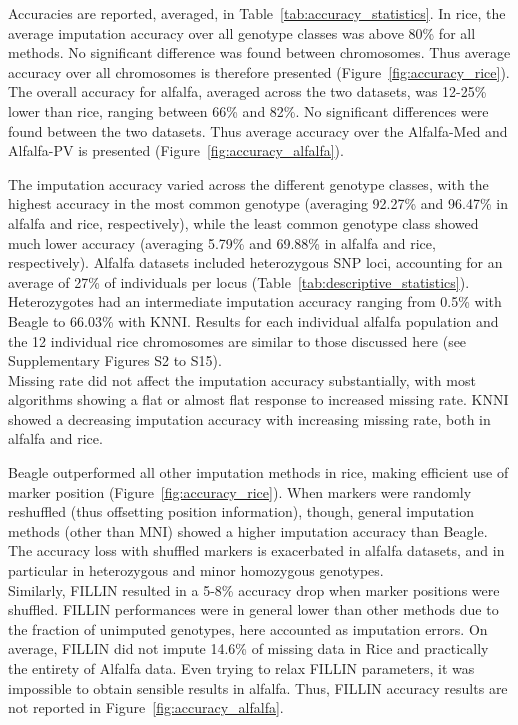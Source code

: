  

Accuracies are reported, averaged, in Table~\ref{tab:accuracy_statistics}. In rice, the average imputation accuracy over all genotype classes was above 80\% for all methods. No significant difference was found between chromosomes. Thus average accuracy over all chromosomes is therefore presented (Figure~\ref{fig:accuracy_rice}). \\
The overall accuracy for alfalfa, averaged across the two datasets, was 12-25\% lower than rice, ranging between 66\% and 82\%. No significant differences were found between the two datasets. Thus average accuracy over the Alfalfa-Med and Alfalfa-PV is presented (Figure~\ref{fig:accuracy_alfalfa}).

The imputation accuracy varied across the different genotype classes, with the highest accuracy in the most common genotype (averaging 92.27\% and 96.47\% in alfalfa and rice, respectively), while the least common genotype class showed much lower accuracy (averaging 5.79\% and 69.88\% in alfalfa and rice, respectively).
Alfalfa datasets included heterozygous SNP loci, accounting for an average of 27\% of individuals per locus (Table~\ref{tab:descriptive_statistics}). Heterozygotes had an intermediate imputation accuracy ranging from 0.5\% with Beagle to 66.03\% with KNNI. Results for each individual alfalfa population and the 12 individual rice chromosomes are similar to those discussed here (see Supplementary Figures S2 to S15). \\
Missing rate did not affect the imputation accuracy substantially, with most algorithms showing a flat or almost flat response to increased missing rate. KNNI showed a decreasing imputation accuracy with increasing missing rate, both in alfalfa and rice.

Beagle outperformed all other imputation methods in rice, making efficient use of marker position (Figure~\ref{fig:accuracy_rice}). When markers were randomly reshuffled (thus offsetting position information), though, general imputation methods (other than MNI) showed a higher imputation accuracy than Beagle. The accuracy loss with shuffled markers is exacerbated in alfalfa datasets, and in particular in heterozygous and minor homozygous genotypes.\\
Similarly, FILLIN resulted in a 5-8\% accuracy drop when marker positions were shuffled. FILLIN performances were in general lower than other methods due to the fraction of unimputed genotypes, here accounted as imputation errors. On average, FILLIN did not impute 14.6\% of missing data in Rice and practically the entirety of Alfalfa data. Even trying to relax FILLIN parameters, it was impossible to obtain sensible results in alfalfa. Thus, FILLIN accuracy results are not reported in Figure~\ref{fig:accuracy_alfalfa}.

